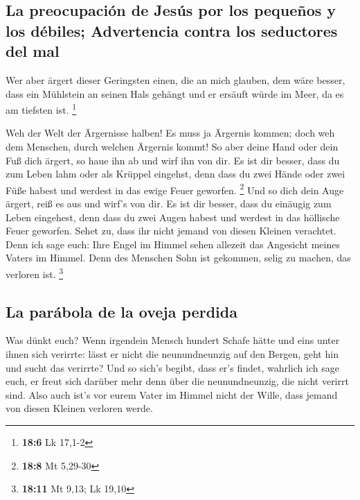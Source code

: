 \hypertarget{la-preocupaciuxf3n-de-jesuxfas-por-los-pequeuxf1os-y-los-duxe9biles-advertencia-contra-los-seductores-del-mal}{%
\subsection{La preocupación de Jesús por los pequeños y los débiles;
Advertencia contra los seductores del
mal}\label{la-preocupaciuxf3n-de-jesuxfas-por-los-pequeuxf1os-y-los-duxe9biles-advertencia-contra-los-seductores-del-mal}}

 Wer aber ärgert dieser Geringsten einen, die an mich
glauben, dem wäre besser, dass ein Mühlstein an seinen Hals gehängt und
er ersäuft würde im Meer, da es am tiefsten ist. \footnote{\textbf{18:6}
  Lk 17,1-2}

 Weh der Welt der Ärgernisse halben! Es muss ja Ärgernis
kommen; doch weh dem Menschen, durch welchen Ärgernis kommt!
 So aber deine Hand oder dein Fuß dich ärgert, so haue ihn
ab und wirf ihn von dir. Es ist dir besser, dass du zum Leben lahm oder
als Krüppel eingehst, denn dass du zwei Hände oder zwei Füße habest und
werdest in das ewige Feuer geworfen. \footnote{\textbf{18:8} Mt 5,29-30}
 Und so dich dein Auge ärgert, reiß es aus und wirf's von
dir. Es ist dir besser, dass du einäugig zum Leben eingehest, denn dass
du zwei Augen habest und werdest in das höllische Feuer geworfen.
 Sehet zu, dass ihr nicht jemand von diesen Kleinen
verachtet. Denn ich sage euch: Ihre Engel im Himmel sehen allezeit das
Angesicht meines Vaters im Himmel.  Denn des Menschen
Sohn ist gekommen, selig zu machen, das verloren ist. \footnote{\textbf{18:11}
  Mt 9,13; Lk 19,10}

\hypertarget{la-paruxe1bola-de-la-oveja-perdida}{%
\subsection{La parábola de la oveja
perdida}\label{la-paruxe1bola-de-la-oveja-perdida}}

 Was dünkt euch? Wenn irgendein Mensch hundert Schafe
hätte und eins unter ihnen sich verirrte: lässt er nicht die
neunundneunzig auf den Bergen, geht hin und sucht das verirrte?
 Und so sich's begibt, dass er's findet, wahrlich ich
sage euch, er freut sich darüber mehr denn über die neunundneunzig, die
nicht verirrt sind.  Also auch ist's vor eurem Vater im
Himmel nicht der Wille, dass jemand von diesen Kleinen verloren werde.

